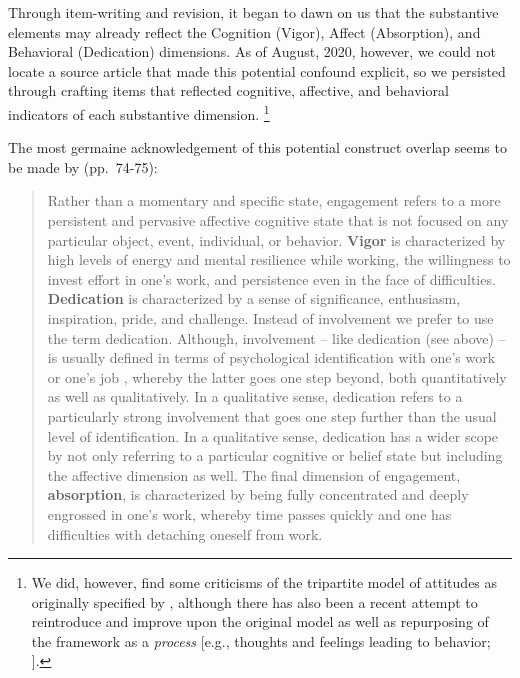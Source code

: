 \documentclass[
]{book}
\begin{document}
Through item-writing and revision, it began to dawn on us that the substantive elements may already reflect the Cognition (Vigor), Affect (Absorption), and Behavioral (Dedication) dimensions. As of August, 2020, however, we could not locate a source article that made this potential confound explicit, so we persisted through crafting items that reflected cognitive, affective, and behavioral indicators of each substantive dimension. \footnote{We did, however, find some criticisms of the tripartite model of attitudes as originally specified by \citet{rosenberg_cognitive_1960}, although there has also been a recent attempt to reintroduce and improve upon the original model \citep{kaiser_campbell_2019} as well as repurposing of the framework as a \emph{process} {[}e.g., thoughts and feelings leading to behavior; \citet{pachankis_psychological_2007}{]}.}

The most germaine acknowledgement of this potential construct overlap seems to be made by \citet{schaufeli_measurement_2002} (pp.~74-75):

\begin{quote}
Rather than a momentary and specific state, engagement refers to a more persistent and pervasive affective cognitive state that is not focused on any particular object, event, individual, or behavior. \textbf{Vigor} is characterized by high levels of energy and mental resilience while working, the willingness to invest effort in one's work, and persistence even in the face of difficulties. \textbf{Dedication} is characterized by a sense of significance, enthusiasm, inspiration, pride, and challenge. Instead of involvement we prefer to use the term dedication. Although, involvement -- like dedication (see above) -- is usually defined in terms of psychological identification with one's work or one's job \citep{kanungo1982measurement, lawler1970relationship} , whereby the latter goes one step beyond, both quantitatively as well as qualitatively. In a qualitative sense, dedication refers to a particularly strong involvement that goes one step further than the usual level of identification. In a qualitative sense, dedication has a wider scope by not only referring to a particular cognitive or belief state but including the affective dimension as well. The final dimension of engagement, \textbf{absorption}, is characterized by being fully concentrated and deeply engrossed in one's work, whereby time passes quickly and one has difficulties with detaching oneself from work.
\end{quote}
\end{document}
